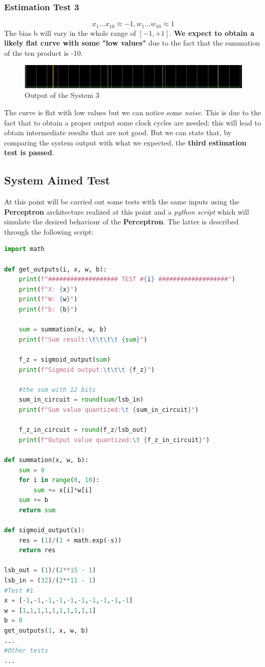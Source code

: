 \subsubsection{Estimation Test 3}
\begin{equation}
	x_{1} \dots x_{10} \approx -1, w_{1} \dots w_{10} \approx 1
\end{equation}
The bias b will vary in the whole range of $[-1, +1]$.\textbf{ We expect to obtain a likely flat curve with some "low values"} due to the fact that the summation of the ten product is -10.
\begin{figure}[H]
	\centering
	\caption{Output of the System 3}
	\includegraphics[width=\textwidth]{img/est_test_3.png}
\end{figure}
The curve is flat with low values but we can notice some \textit{noise}. This is due to the fact that to obtain a proper output some clock cycles are needed: this will lead to obtain intermediate results that are not good. But we can state that, by comparing the system output with what we expected, the \textbf{third estimation test is passed}.
\subsection{System Aimed Test}
At this point will be carried out some tests with the same inputs using the \textbf{Perceptron} architecture realized at this point and a \textit{python script} which will simulate the desired behaviour of the \textbf{Perceptron}. The latter is described through the following script:

\begin{lstlisting}[language=python]
import math

def get_outputs(i, x, w, b):
	print(f"################### TEST #{i} ###################")
	print(f"X: {x}")
	print(f"W: {w}")
	print(f"b: {b}")
	
	sum = summation(x, w, b)
	print(f"Sum result:\t\t\t\t {sum}")
	
	f_z = sigmoid_output(sum)
	print(f"Sigmoid output:\t\t\t {f_z}")
	
	#the sum with 12 bits
	sum_in_circuit = round(sum/lsb_in)
	print(f"Sum value quantized:\t {sum_in_circuit}")

	f_z_in_circuit = round(f_z/lsb_out)
	print(f"Output value quantized:\t {f_z_in_circuit}")

def summation(x, w, b):
	sum = 0
	for i in range(0, 10):
		sum += x[i]*w[i]
	sum += b
	return sum

def sigmoid_output(s):
	res = (1)/(1 + math.exp(-s))
	return res

lsb_out = (1)/(2**15 - 1)
lsb_in = (32)/(2**11 - 1)
#Test #1
x = [-1,-1,-1,-1,-1,-1,-1,-1,-1,-1]
w = [1,1,1,1,1,1,1,1,1,1]
b = 0
get_outputs(1, x, w, b)
...
#Other tests
...
\end{lstlisting}

